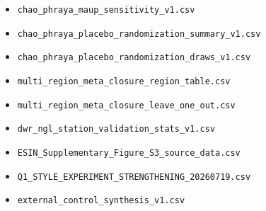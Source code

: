 \documentclass[11pt]{article}
\begin{document}
\begin{itemize}
  \item \texttt{chao\_phraya\_maup\_sensitivity\_v1.csv}
  \item \texttt{chao\_phraya\_placebo\_randomization\_summary\_v1.csv}
  \item \texttt{chao\_phraya\_placebo\_randomization\_draws\_v1.csv}
  \item \texttt{multi\_region\_meta\_closure\_region\_table.csv}
  \item \texttt{multi\_region\_meta\_closure\_leave\_one\_out.csv}
  \item \texttt{dwr\_ngl\_station\_validation\_stats\_v1.csv}
  \item \texttt{ESIN\_Supplementary\_Figure\_S3\_source\_data.csv}
  \item \texttt{Q1\_STYLE\_EXPERIMENT\_STRENGTHENING\_20260719.csv}
  \item \texttt{external\_control\_synthesis\_v1.csv}
\end{itemize}
\end{document}
